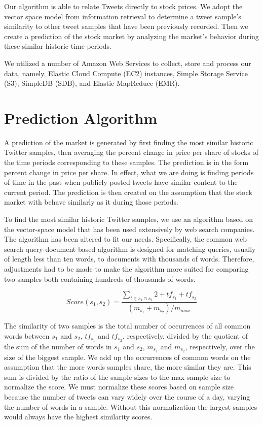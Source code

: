\documentclass[twocolumn]{article}
\begin{document}
Our algorithm is able to relate Tweets directly to stock prices. We adopt the vector space model from information retrieval to determine a tweet sample's similarity to other tweet samples that have been previously recorded. Then we create a prediction of the stock market by analyzing the market's behavior during these similar historic time periods.

We utilized a number of Amazon Web Services to collect, store and process our data, namely, Elastic Cloud Compute (EC2) instances, Simple Storage Service (S3), SimpleDB (SDB), and Elastic MapReduce (EMR).

\section{Prediction Algorithm}
A prediction of the market is generated by first finding the most similar historic Twitter samples, then averaging the percent change in price per share of stocks of the time periods corresponding to these samples. The prediction is in the form percent change in price per share. In effect, what we are doing is finding periods of time in the past when publicly posted tweets have similar content to the current period. The prediction is then created on the assumption that the stock market with behave similarly as it during those periods.

To find the most similar historic Twitter samples, we use an algorithm based on the vector-space model that has been used extensively by web search companies. The algorithm has been altered to fit our needs. Specifically, the common web search query-document based algorithm is designed for matching queries, usually of length less than ten words, to documents with thousands of words. Therefore, adjustments had to be made to make the algorithm more suited for comparing two samples both containing hundreds of thousands of words.

$$ Score(s_1, s_2) = \frac{\sum_{t \in s_1 \cap s_2} 2+tf_{s_1}+tf_{s_2}}{(m_{s_1}+m_{s_2}) / m_{max}} $$ 	

The similarity of two samples is the total number of occurrences of all common words between $s_1$ and $s_2$, $tf_{s_1}$ and $tf_{s_2}$, respectively, divided by the quotient of the sum of the number of words in $s_1$ and $s_2$, $m_{s_1}$ and $m_{s_2}$, respectively, over the size of the biggest sample. We add up the occurrences of common words on the assumption that the more words samples share, the more similar they are. This sum is divided by the ratio of the sample sizes to the max sample size to normalize the score. We must normalize these scores based on sample size because the number of tweets can vary widely over the course of a day, varying the number of words in a sample. Without this normalization the largest samples would always have the highest similarity scores.
\end{document}
